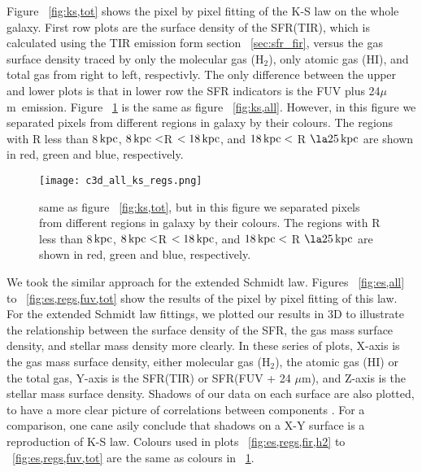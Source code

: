 \documentclass[useAMS,usenatbib]{mn2e}
\newcommand \kpc        {\,{\rm kpc}}
\newcommand \um    {$\mu$m\ }
\begin{document}
Figure ~\ref{fig:ks,tot} shows the pixel by pixel fitting of the K-S law on the whole galaxy. First row plots are the surface density of the SFR(TIR), which is calculated using  the TIR emission form section ~\ref{sec:sfr_fir}, versus the gas surface density traced by only the molecular gas (H$_2$),  only atomic gas (HI), and total gas from right to left, respectivly. The only difference between the upper and lower plots is that in lower row the SFR indicators is the FUV plus 24\um emission. Figure ~\ref{fig:ks,regs} is the same as figure ~\ref{fig:ks,all}. However, in this figure we separated pixels from different regions in galaxy by their colours. The regions with R less than 8$\kpc$, $8\kpc < $R $< 18\kpc$, and $18\kpc <$ R $\la 25\kpc$ are shown in red, green and blue, respectively. 





\begin{figure*}
\texttt{[image: c3d\_all\_ks\_regs.png]}
\caption{same as figure ~\ref{fig:ks,tot}, but in this figure we separated pixels from different regions in galaxy by their colours. The regions with R less than 8$\kpc$, $8\kpc < $R $< 18\kpc$, and $18\kpc <$ R $\la 25\kpc$ are shown in red, green and blue, respectively.}
\label{fig:ks,regs}
\end{figure*}

We took the similar approach for the extended Schmidt law. Figures ~\ref{fig:es,all} to ~\ref{fig:es,regs,fuv,tot} show the results of the pixel by pixel fitting of this law. For the extended Schmidt law fittings, we plotted our results in 3D to illustrate the relationship between the surface density of the SFR, the gas mass surface density, and stellar mass density more clearly. In these series of plots, X-axis is the gas mass  surface density, either molecular gas (H$_2$), the atomic gas (HI) or the total gas, Y-axis is the SFR(TIR) or SFR(FUV + 24 $\mu$m), and Z-axis is the stellar mass surface density. Shadows of our data on each surface are also plotted, to have a more clear picture of correlations between components . For a comparison, one cane asily conclude that shadows on a X-Y surface is a reproduction of K-S law. Colours used in plots ~\ref{fig:es,regs,fir,h2} to ~\ref{fig:es,regs,fuv,tot} are the same as colours in  ~\ref{fig:ks,regs}.
\end{document}

